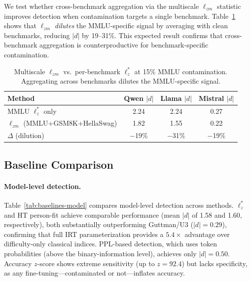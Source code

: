 \documentclass[11pt,a4paper]{article}
\begin{document}
We test whether cross-benchmark aggregation via the multiscale $\ell_{zm}$ statistic \citep{hong2021multiscale} improves detection when contamination targets a single benchmark.
Table~\ref{tab:lzm} shows that $\ell_{zm}$ \emph{dilutes} the MMLU-specific signal by averaging with clean benchmarks, reducing $|d|$ by 19--31\%.
This expected result confirms that cross-benchmark aggregation is counterproductive for benchmark-specific contamination.

\begin{table}[t]
\centering
\caption{Multiscale $\ell_{zm}$ vs.\ per-benchmark $\ell_z^{*}$ at 15\% MMLU contamination. Aggregating across benchmarks dilutes the MMLU-specific signal.}
\label{tab:lzm}
\small
\begin{tabular}{lccc}
\toprule
\textbf{Method} & \textbf{Qwen $|d|$} & \textbf{Llama $|d|$} & \textbf{Mistral $|d|$} \\
\midrule
MMLU $\ell_z^{*}$ only                      & 2.24 & 2.24 & 0.27 \\
$\ell_{zm}$ (MMLU+GSM8K+HellaSwag)          & 1.82 & 1.55 & 0.22 \\
$\Delta$ (dilution)                           & $-$19\% & $-$31\% & $-$19\% \\
\bottomrule
\end{tabular}
\end{table}

\subsection{Baseline Comparison}
\label{sec:results-baselines}

\paragraph{Model-level detection.}
Table~\ref{tab:baselines-model} compares model-level detection across methods.
$\ell_z^{*}$ and HT person-fit achieve comparable performance (mean $|d|$ of 1.58 and 1.60, respectively), both substantially outperforming Guttman/U3 ($|d|=0.29$), confirming that full IRT parameterization provides a $5.4\times$ advantage over difficulty-only classical indices.
PPL-based detection, which uses token probabilities (above the binary-information level), achieves only $|d|=0.50$.
Accuracy $z$-score shows extreme sensitivity (up to $z=92.4$) but lacks specificity, as any fine-tuning---contaminated or not---inflates accuracy.
\end{document}
